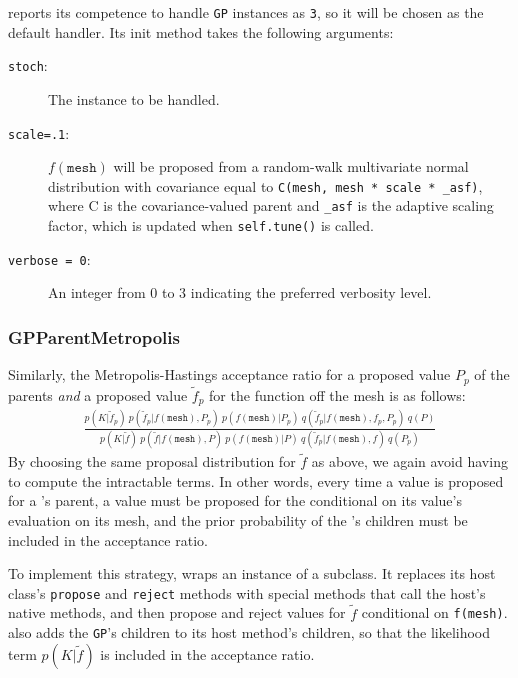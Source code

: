 \documentclass[]{manual}
\begin{document}
 reports its competence to handle \texttt{GP} instances as \texttt{3}, so it will be chosen as the default handler. Its init method takes the following arguments:
\begin{description}
    \item[\texttt{stoch}:] The  instance to be handled.
    \item[\texttt{scale=.1}:] $f(\texttt{mesh})$ will be proposed from a random-walk multivariate normal distribution with covariance equal to \texttt{C(mesh, mesh * scale * _asf)}, where C is the covariance-valued parent and \texttt{_asf} is the adaptive scaling factor, which is updated when \texttt{self.tune()} is called.
    \item[\texttt{verbose = 0}:] An integer from 0 to 3 indicating the preferred verbosity level.
\end{description}

\subsubsection{GPParentMetropolis} 
Similarly, the Metropolis-Hastings acceptance ratio for a proposed value $P_p$ of the parents \emph{and} a proposed value $\tilde f_p$ for the function off the mesh is as follows:
\begin{eqnarray*}
    \frac{p(K|\tilde f_p)\ p(\tilde f_p|f(\texttt{mesh}), P_p)\ p(f(\texttt{mesh}) | P_p)\ q(\tilde f_p|f(\texttt{mesh}),f_p, P_p)\ q(P)}{p(K|\tilde f)\ p(\tilde f|f(\texttt{mesh}), P)\ p(f(\texttt{mesh}) | P)\ q(\tilde f_p|f(\texttt{mesh}),f)\ q(P_p)}
\end{eqnarray*}
By choosing the same proposal distribution for $\tilde f$ as above, we again avoid having to compute the intractable terms. In other words, every time a value is proposed for a 's parent, a value must be proposed for the   conditional on its value's evaluation on its mesh, and the prior probability of the 's children must be included in the acceptance ratio. 

To implement this strategy,  wraps an instance of a  subclass. It replaces its host class's \texttt{propose} and \texttt{reject} methods with special methods that call the host's native methods, and then propose and reject values for $\tilde f$ conditional on \texttt{f(mesh)}.  also adds the \texttt{GP}'s children to its host method's children, so that the likelihood term $p(K|\tilde f)$ is included in the acceptance ratio.
\end{document}
